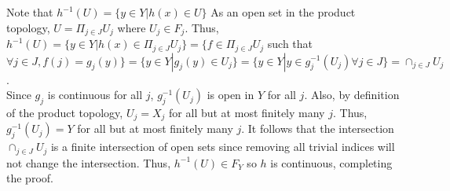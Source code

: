 \documentclass{article}
\begin{document}
Note that $h^{-1}(U) = \{y \in Y | h(x) \in U\}$  As an open set in the product topology, $U = \Pi_{j \in J}U_j$ where $U_j \in F_j$.  Thus, $h^{-1}(U) = \{y \in Y | h(x) \in \Pi_{j \in J}U_j\} = \{f \in \Pi_{j \in J}U_j$ such that $\forall j \in J, f(j) = g_{j}(y)\} = \{y \in Y | g_{j}(y) \in U_j\} = \{y \in Y | y \in g_{j}^{-1}(U_j) \forall j \in J\} = \cap_{j \in J} U_j$.\\
Since $g_j$ is continuous for all $j$, $g_{j}^{-1}(U_j)$ is open in $Y$ for all $j$.  Also, by definition of the product topology, $U_j = X_j$ for all but at most finitely many $j$.  Thus, $g_{j}^{-1}(U_j) = Y$ for all but at most finitely many $j$.  It follows that the intersection $\cap_{j \in J} U_j$ is a finite intersection of open sets since removing all trivial indices will not change the intersection.  Thus, $h^{-1}(U) \in F_Y$ so $h$ is continuous, completing the proof.
\end{document}
